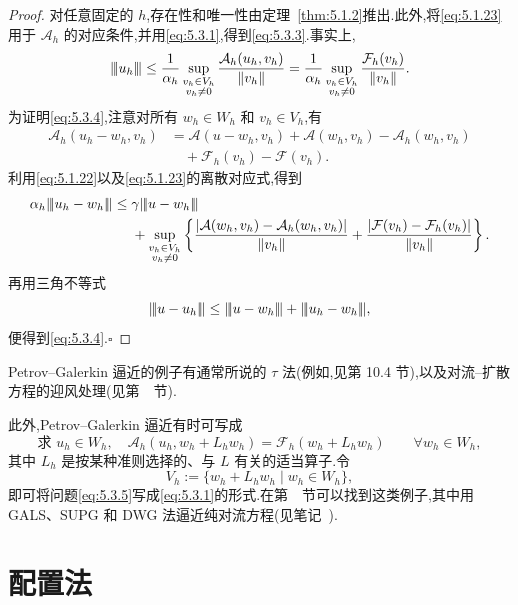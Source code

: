 \begin{proof}
对任意固定的 \(h\),存在性和唯一性由定理~\ref{thm:5.1.2}推出.此外,将\eqref{eq:5.1.23}用于 \(\mathcal A_h\) 的对应条件,并用\eqref{eq:5.3.1},得到\eqref{eq:5.3.3}.事实上,
\[
  \lVert\!\lvert u_h\rvert\!\rVert\le\frac1{\alpha_h}\sup_{\substack{v_h\in V_h\\v_h\ne0}}
       \frac{\mathcal A_h(u_h,v_h)}{\|v_h\|}
    =\frac1{\alpha_h}\sup_{\substack{v_h\in V_h\\v_h\ne0}}
       \frac{\mathcal F_h(v_h)}{\|v_h\|}.
\]
为证明\eqref{eq:5.3.4},注意对所有 \(w_h\in W_h\) 和 \(v_h\in V_h\),有
\[
  \begin{aligned}
    \mathcal A_h(u_h-w_h,v_h)
     &=\mathcal A(u-w_h,v_h)+\mathcal A(w_h,v_h)-\mathcal A_h(w_h,v_h)\\
     &\quad+\mathcal F_h(v_h)-\mathcal F(v_h).
  \end{aligned}
\]
利用\eqref{eq:5.1.22}以及\eqref{eq:5.1.23}的离散对应式,得到
\[
  \begin{aligned}
    \alpha_h\lVert\!\lvert u_h-w_h\rvert\!\rVert\le{}&\gamma\lVert\!\lvert u-w_h\rvert\!\rVert\\
      &+\sup_{\substack{v_h\in V_h\\v_h\ne0}}\left\{
         \frac{|\mathcal A(w_h,v_h)-\mathcal A_h(w_h,v_h)|}{\|v_h\|}
         +\frac{|\mathcal F(v_h)-\mathcal F_h(v_h)|}{\|v_h\|}\right\}.
  \end{aligned}
\]
再用三角不等式
\[
  \lVert\!\lvert u-u_h\rvert\!\rVert\le\lVert\!\lvert u-w_h\rvert\!\rVert+\lVert\!\lvert u_h-w_h\rvert\!\rVert,
\]
便得到\eqref{eq:5.3.4}.\hfill\(\square\)
\end{proof}

Petrov--Galerkin 逼近的例子有通常所说的 \(\tau\) 法(例如,见第 10.4 节),以及对流--扩散方程的迎风处理(见第~~节).

此外,Petrov--Galerkin 逼近有时可写成
\begin{equation}\label{eq:5.3.5}
  \text{求 }u_h\in W_h,\quad
  \mathcal A_h(u_h,w_h+L_hw_h)=\mathcal F_h(w_h+L_hw_h)
    \qquad\forall w_h\in W_h,
\end{equation}
其中 \(L_h\) 是按某种准则选择的、与 \(L\) 有关的适当算子.令
\[
  V_h:=\{w_h+L_hw_h\mid w_h\in W_h\},
\]
即可将问题\eqref{eq:5.3.5}写成\eqref{eq:5.3.1}的形式.在第~~节可以找到这类例子,其中用 GALS、SUPG 和 DWG 法逼近纯对流方程(见笔记~).

\section{配置法}\label{sec:5.4}

